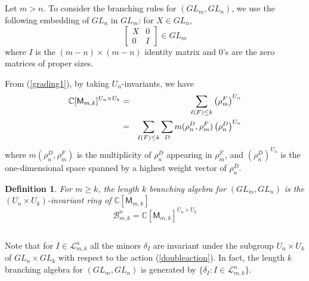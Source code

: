 \documentclass[11pt]{amsart}
\numberwithin{equation}{subsection}
\newtheorem{definition}[theorem]{Definition}
\begin{document}
\subsection{}
Let $m>n$. To consider the branching rules for $({GL}_{m},{GL}_{n})$, we use
the following embedding of ${GL}_{n}$ in ${GL}_{m}$: for $X\in {GL}_{n}$,
\begin{equation*}
\left[ 
\begin{array}{cc}
X & 0 \\ 
0 & I\end{array}\right] \in {GL}_{m}
\end{equation*}
where $I$ is the $(m-n) \times (m-n)$ identity matrix and $0$'s are the zero
matrices of proper sizes.

From (\ref{grading1}), by taking $U_{n}$-invariants, we have 
\begin{eqnarray}
\mathbb{C}[\mathsf{M}_{m,k}]^{U_{n}\times U_{k}} &=&\sum\limits_{\ell
(F)\leq k}\left( \rho _{m}^{F}\right) ^{U_{n}}  \label{UU-decomposition} \\
&=&\sum\limits_{\ell (F)\leq k}\sum\limits_{D}m(\rho _{n}^{D},\rho
_{m}^{F})\left( \rho _{n}^{D}\right) ^{U_{n}}  \notag
\end{eqnarray}
where $m(\rho _{n}^{D},\rho _{m}^{F})$ is the multiplicity of $\rho _{n}^{D}$
appearing in $\rho _{m}^{F}$, and $\left( \rho _{n}^{D}\right) ^{U_{n}}$ is
the one-dimensional space spanned by a highest weight vector of $\rho_{n}^{D}$.

\begin{definition}\label{Bmkn}
For $m\geq k$, the length $k$ branching algebra for $({GL}_{m},{GL}_{n})$ is
the $(U_{n}\times U_{k})$-invariant ring of $\mathbb{C}[\mathsf{M}_{m,k}]$
\begin{equation*}
\mathcal{B}_{m,k}^{n}=\mathbb{C}[\mathsf{M}_{m,k}]^{U_{n}\times U_{k}}
\end{equation*}
\end{definition}

\medskip

\subsection{}

Note that for $I\in \mathcal{L}_{m,k}^{n}$ all the minors $\delta _{I}$ are
invariant under the subgroup $U_{n}\times U_{k}$ of ${GL}_{n}\times {GL}_{k}$
with respect to the action (\ref{doubleaction}). In fact, the length $k$ branching algebra 
for $({GL}_{m},{GL}_{n})$ is generated by $\{\delta_{I}:I\in \mathcal{L}_{m,k}^{n}\}$.
\end{document}
